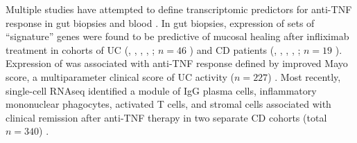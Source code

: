 Multiple studies have attempted to define transcriptomic predictors for anti-\gls{TNF} response in gut biopsies and blood \autocite{digby-bell2019InterrogatingHostImmunity,noor2020PersonalisedMedicineCrohn}.
In gut biopsies, expression of sets of \enquote{signature} genes were found to be predictive of mucosal healing after infliximab treatment in cohorts of 
\gls{UC} (, , , , ; $n=46$ \autocite{arijs2009MucosalGeneSignatures}) 
and \gls{CD} patients (, , , , ; $n=19$ \autocite{arijs2010PredictiveValueEpithelial}).
Expression of  was associated with anti-\gls{TNF} response defined by improved Mayo score, a multiparameter clinical score of \gls{UC} activity ($n=227$) \autocite{west2017OncostatinDrivesIntestinal}.
Most recently, single-cell \gls{RNAseq} identified a module of IgG plasma cells, inflammatory mononuclear phagocytes, activated T cells, and stromal cells associated with clinical remission after anti-\gls{TNF} therapy in two separate \gls{CD} cohorts (total $n=340$) \autocite{martin2019SingleCellAnalysisCrohn}.

